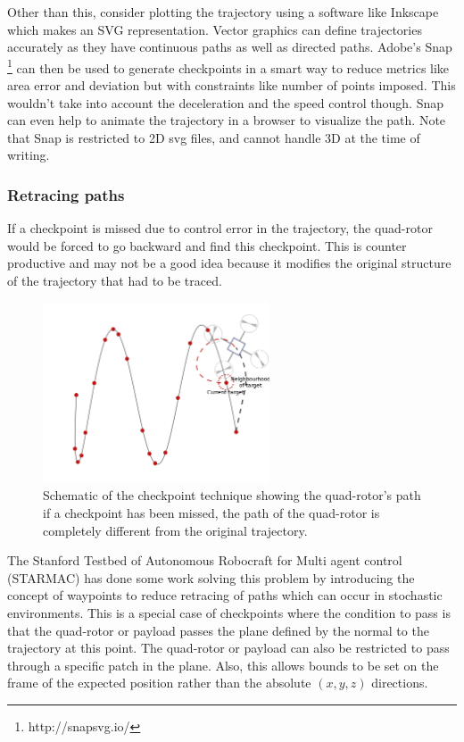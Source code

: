 \documentclass[hidelinks,BTech]{iitmdiss}
\begin{document}
Other than this, consider plotting the trajectory using a software like Inkscape which makes an SVG representation. Vector graphics can define trajectories accurately as they have continuous paths as well as directed paths. Adobe's Snap \footnote{http://snapsvg.io/} can then be used to generate checkpoints in a smart way to reduce metrics like area error and deviation but with constraints like number of points imposed. This wouldn't take into account the deceleration and the speed control though. Snap can even help to animate the trajectory in a browser to visualize the path. Note that Snap is restricted to 2D svg files, and cannot handle 3D at the time of writing.

\subsubsection{Retracing paths}
If a checkpoint is missed due to control error in the trajectory, the quad-rotor would be forced to go backward and find this checkpoint. This is counter productive and may not be a good idea because it modifies the original structure of the trajectory that had to be traced.


\begin{figure}[H]
  \centering
    \includegraphics[width=0.6\textwidth]{checkpoint_con.png}
    \caption{Schematic of the checkpoint technique showing the quad-rotor's path if a checkpoint has been missed, the path of the quad-rotor is completely different from the original trajectory.}
\end{figure}

The Stanford Testbed of Autonomous Robocraft for Multi agent control (STARMAC) \cite{STARMAC} has done some work solving this problem by introducing the concept of waypoints to reduce retracing of paths which can occur in stochastic environments. This is a special case of checkpoints where the condition to pass is that the quad-rotor or payload passes the plane defined by the normal to the trajectory at this point. The quad-rotor or payload can also be restricted to pass through a specific patch in the plane. Also, this allows bounds to be set on the frame of the expected position rather than the absolute $(x, y, z)$ directions.
\end{document}
